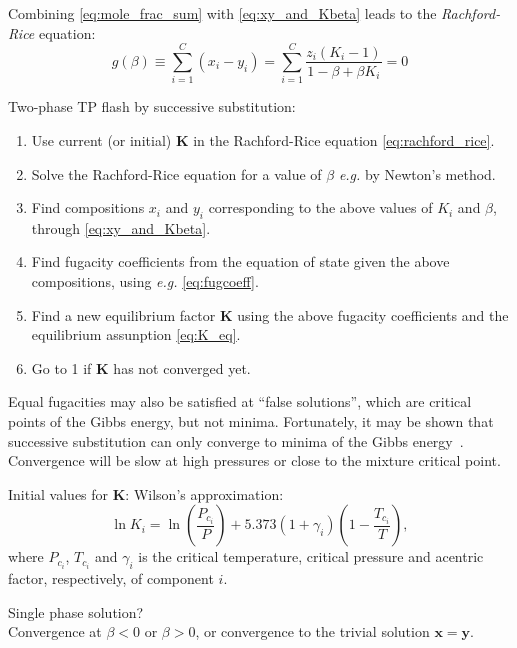\documentclass[internal,english]{sintefmemo2012}
\newcommand*{\vektor}[1]{\boldsymbol{#1}}%
\begin{document}
Combining \eqref{eq:mole_frac_sum} with \eqref{eq:xy_and_Kbeta} leads to the \textit{Rachford-Rice} equation:
\begin{equation}
  g(\beta) \equiv \sum_{i=1}^C \left( x_i - y_i \right) = \sum_{i=1}^C \frac{z_i \left( K_i -1 \right)}{1 -\beta + \beta K_i} = 0
  \label{eq:rachford_rice}
\end{equation}
\begin{framed}
Two-phase TP flash by successive substitution:  
\begin{enumerate}
  \item Use current (or initial) $\vektor{K}$ in the Rachford-Rice equation \eqref{eq:rachford_rice}.
  \item Solve the Rachford-Rice equation for a value of $\beta$ \textit{e.g.} by Newton's method.
  \item Find compositions $x_i$ and $y_i$ corresponding to the above values of $K_i$ and $\beta$, through \eqref{eq:xy_and_Kbeta}.
  \item Find fugacity coefficients from the equation of state given the above compositions, using \textit{e.g.} \eqref{eq:fugcoeff}.
  \item Find a new equilibrium factor $\vektor{K}$ using the above fugacity coefficients and the equilibrium assunption \eqref{eq:K_eq}.
  \item Go to 1 if $\vektor{K}$ has not converged yet.
\end{enumerate}
\end{framed}
Equal fugacities may also be satisfied at ``false solutions'', which are critical points of the Gibbs energy, but not minima.
Fortunately, it may be shown that successive substitution can only converge to minima of the Gibbs energy~\cite{michelsen07}.
Convergence will be slow at high pressures or close to the mixture critical point.

Initial values for $\vektor{K}$:
Wilson's approximation:
\begin{equation}
  \ln K_i = \ln \left( \frac{P_{c_i}}{P} \right) + 5.373(1+\gamma_i) \left( 1-\frac{T_{c_i}}{T} \right),
  \label{eq:wilson_K}
\end{equation}
where $P_{c_i}$, $T_{c_i}$ and $\gamma_{i}$ is the critical temperature, critical pressure and acentric factor, respectively, 
of component $i$.

Single phase solution?\\
Convergence at $\beta <0$ or $\beta>0$, or convergence to the trivial solution $\vektor{x} = \vektor{y}$.\\
\end{document}
